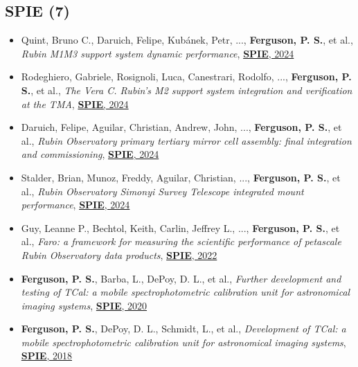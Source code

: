 \subsection{SPIE  (7)}
\begin{itemize}[itemsep=1pt]
    \item {Quint}, Bruno C., {Daruich}, Felipe, {Kub{\'a}nek}, Petr, ..., \textbf{Ferguson, P. S.}, et al., \textit{{Rubin M1M3 support system dynamic performance}}, \href{https://ui.adsabs.harvard.edu/abs/2024SPIE13094E..29Q}{\textbf{SPIE}, 2024}
    \item {Rodeghiero}, Gabriele, {Rosignoli}, Luca, {Canestrari}, Rodolfo, ..., \textbf{Ferguson, P. S.}, et al., \textit{{The Vera C. Rubin's M2 support system integration and verification at the TMA}}, \href{https://ui.adsabs.harvard.edu/abs/2024SPIE13094E..2DR}{\textbf{SPIE}, 2024}
    \item {Daruich}, Felipe, {Aguilar}, Christian, {Andrew}, John, ..., \textbf{Ferguson, P. S.}, et al., \textit{{Rubin Observatory primary tertiary mirror cell assembly: final integration and commissioning}}, \href{https://ui.adsabs.harvard.edu/abs/2024SPIE13094E..51D}{\textbf{SPIE}, 2024}
    \item {Stalder}, Brian, {Munoz}, Freddy, {Aguilar}, Christian, ..., \textbf{Ferguson, P. S.}, et al., \textit{{Rubin Observatory Simonyi Survey Telescope integrated mount performance}}, \href{https://ui.adsabs.harvard.edu/abs/2024SPIE13094E..09S}{\textbf{SPIE}, 2024}
    \item {Guy}, Leanne P., {Bechtol}, Keith, {Carlin}, Jeffrey L., ..., \textbf{Ferguson, P. S.}, et al., \textit{{Faro: a framework for measuring the scientific performance of petascale Rubin Observatory data products}}, \href{https://ui.adsabs.harvard.edu/abs/2022SPIE12189E..0MG}{\textbf{SPIE}, 2022}
    \item \textbf{Ferguson, P. S.}, {Barba}, L., {DePoy}, D. L., et al., \textit{{Further development and testing of TCal: a mobile spectrophotometric calibration unit for astronomical imaging systems}}, \href{https://ui.adsabs.harvard.edu/abs/2020SPIE11447E..5UF}{\textbf{SPIE}, 2020}
    \item \textbf{Ferguson, P. S.}, {DePoy}, D. L., {Schmidt}, L., et al., \textit{{Development of TCal: a mobile spectrophotometric calibration unit for astronomical imaging systems}}, \href{https://ui.adsabs.harvard.edu/abs/2018SPIE10702E..3AF}{\textbf{SPIE}, 2018}
\end{itemize}
